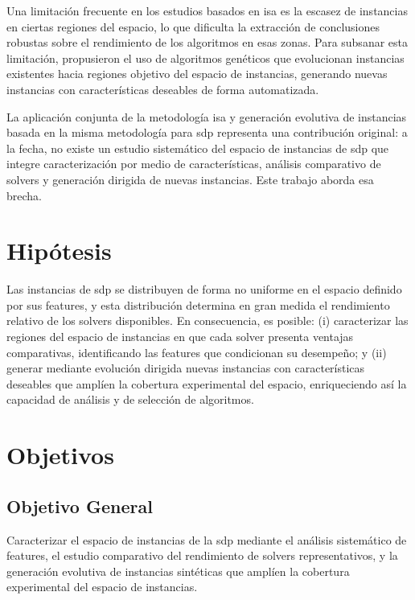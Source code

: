 Una limitación frecuente en los estudios basados en \acrshort{isa} es la escasez de
instancias en ciertas regiones del espacio, lo que dificulta la extracción de conclusiones
robustas sobre el rendimiento de los algoritmos en esas zonas.
Para subsanar esta limitación, \textcite{smith-milesGeneratingNewTest2015}
propusieron el uso de algoritmos genéticos que evolucionan instancias existentes hacia
regiones objetivo del espacio de instancias, generando nuevas instancias con características
deseables de forma automatizada.

La aplicación conjunta de la metodología \acrshort{isa} y generación evolutiva de instancias basada 
en la misma metodología para \acrshort{sdp} representa una contribución original: a la fecha, no existe un estudio
sistemático del espacio de instancias de \acrshort{sdp} que integre caracterización
por medio de características, análisis comparativo de \glspl{solver} y generación dirigida de nuevas 
instancias.
Este trabajo aborda esa brecha.

\section{Hipótesis}%

Las instancias de \acrshort{sdp} se distribuyen de forma no uniforme en el espacio definido
por sus \glspl{feature}, y esta distribución determina en gran medida el
rendimiento relativo de los \glspl{solver} disponibles. En consecuencia, es posible: (i) caracterizar
las regiones del espacio de instancias en que cada \gls{solver} presenta ventajas comparativas,
identificando las \glspl{feature} que condicionan su desempeño; y (ii) generar mediante
evolución dirigida nuevas instancias con características deseables que amplíen la
cobertura experimental del espacio, enriqueciendo así la capacidad de análisis y de selección de
algoritmos.

\section{Objetivos}

\subsection{Objetivo General}%

Caracterizar el espacio de instancias de la \acrfull{sdp} mediante el análisis sistemático de
\glspl{feature}, el estudio comparativo del rendimiento de \glspl{solver} representativos,
y la generación evolutiva de instancias sintéticas que amplíen la cobertura experimental del espacio de
instancias.

